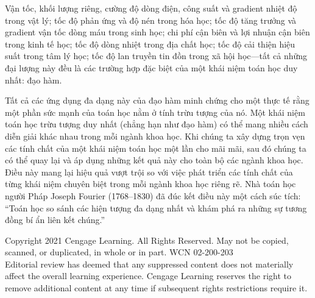 Vận tốc, khối lượng riêng, cường độ dòng điện, công suất và gradient nhiệt độ trong vật lý; tốc độ phản ứng và độ nén trong hóa học; tốc độ tăng trưởng và gradient vận tốc dòng máu trong sinh học; chi phí cận biên và lợi nhuận cận biên trong kinh tế học; tốc độ dòng nhiệt trong địa chất học; tốc độ cải thiện hiệu suất trong tâm lý học; tốc độ lan truyền tin đồn trong xã hội học---tất cả những đại lượng này đều là các trường hợp đặc biệt của một khái niệm toán học duy nhất: đạo hàm.

Tất cả các ứng dụng đa dạng này của đạo hàm minh chứng cho một thực tế rằng một phần sức mạnh của toán học nằm ở tính trừu tượng của nó. Một khái niệm toán học trừu tượng duy nhất (chẳng hạn như đạo hàm) có thể mang nhiều cách diễn giải khác nhau trong mỗi ngành khoa học. Khi chúng ta xây dựng trọn vẹn các tính chất của một khái niệm toán học một lần cho mãi mãi, sau đó chúng ta có thể quay lại và áp dụng những kết quả này cho toàn bộ các ngành khoa học. Điều này mang lại hiệu quả vượt trội so với việc phát triển các tính chất của từng khái niệm chuyên biệt trong mỗi ngành khoa học riêng rẽ. Nhà toán học người Pháp Joseph Fourier (1768--1830) đã đúc kết điều này một cách súc tích: “Toán học so sánh các hiện tượng đa dạng nhất và khám phá ra những sự tương đồng bí ẩn liên kết chúng.”

\vfill
\begin{center}
\fontsize{6}{7.5}\selectfont \color{gray!80!black}
Copyright 2021 Cengage Learning. All Rights Reserved. May not be copied, scanned, or duplicated, in whole or in part. WCN 02-200-203\\
Editorial review has deemed that any suppressed content does not materially affect the overall learning experience. Cengage Learning reserves the right to remove additional content at any time if subsequent rights restrictions require it.
\end{center}
